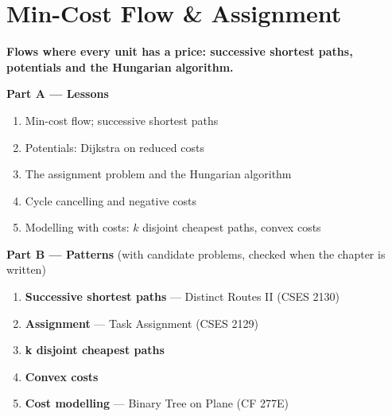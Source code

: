 \chapter{Min-Cost Flow \& Assignment}
\label{ch:min_cost_flow}

\begin{tcolorbox}[enhanced, colback=white, colframe=secondaryblue, boxrule=1pt, arc=2mm]
\textbf{\large\textcolor{primaryblue}{Flows where every unit has a price: successive shortest paths, potentials and the Hungarian algorithm.}}
\end{tcolorbox}


\begin{plannedbox}
\textbf{Part A --- Lessons}
\begin{enumerate}[leftmargin=*, label=\textbf{A\arabic*.}, itemsep=1pt]
    \item Min-cost flow; successive shortest paths
    \item Potentials: Dijkstra on reduced costs
    \item The assignment problem and the Hungarian algorithm
    \item Cycle cancelling and negative costs
    \item Modelling with costs: $k$ disjoint cheapest paths, convex costs
\end{enumerate}
\textbf{Part B --- Patterns} (with candidate problems, checked when the chapter is written)
\begin{enumerate}[leftmargin=*, label=\textbf{P\arabic*.}, itemsep=1pt]
    \item \textbf{Successive shortest paths} --- Distinct Routes II {\small\color{darkgray}(CSES 2130)}
    \item \textbf{Assignment} --- Task Assignment {\small\color{darkgray}(CSES 2129)}
    \item \textbf{k disjoint cheapest paths}
    \item \textbf{Convex costs}
    \item \textbf{Cost modelling} --- Binary Tree on Plane {\small\color{darkgray}(CF 277E)}
\end{enumerate}
\end{plannedbox}
